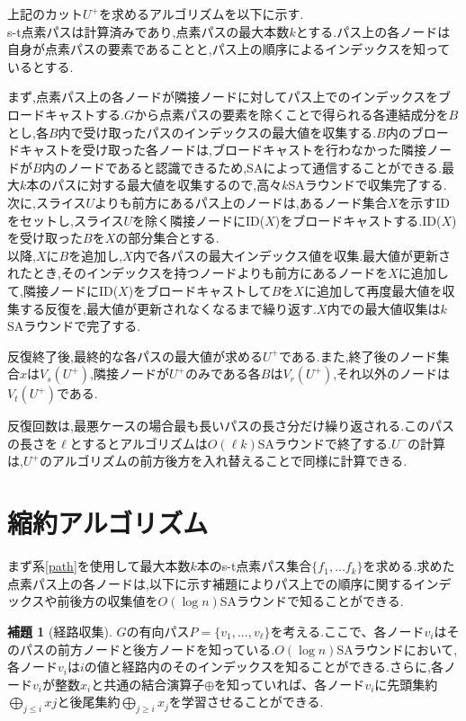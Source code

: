 \documentclass{thesis}
\theoremstyle{definition}
\newtheorem{lemma}{補題}
\begin{document}
上記のカット$U^+$を求めるアルゴリズムを以下に示す.\\
s-t点素パスは計算済みであり,点素パスの最大本数$k$とする.パス上の各ノードは自身が点素パスの要素であることと,パス上の順序によるインデックスを知っているとする.\par
まず,点素パス上の各ノードが隣接ノードに対してパス上でのインデックスをブロードキャストする.$G$から点素パスの要素を除くことで得られる各連結成分を$B$とし,各$B$内で受け取ったパスのインデックスの最大値を収集する.$B$内のブロードキャストを受け取った各ノードは,ブロードキャストを行わなかった隣接ノードが$B$内のノードであると認識できるため,SAによって通信することができる.最大$k$本のパスに対する最大値を収集するので,高々$k$SAラウンドで収集完了する.\\
次に,スライス$U$よりも前方にあるパス上のノードは,あるノード集合$X$を示すIDをセットし,スライス$U$を除く隣接ノードにID($X$)をブロードキャストする.ID($X$)を受け取った$B$を$X$の部分集合とする.\\
以降,$X$に$B$を追加し,$X$内で各パスの最大インデックス値を収集.最大値が更新されたとき,そのインデックスを持つノードよりも前方にあるノードを$X$に追加して,隣接ノードにID($X$)をブロードキャストして$B$を$X$に追加して再度最大値を収集する反復を,最大値が更新されなくなるまで繰り返す.$X$内での最大値収集は$k$SAラウンドで完了する.\par
反復終了後,最終的な各パスの最大値が求める$U^+$である.また,終了後のノード集合$x$は$V_s(U^+)$,隣接ノードが$U^+$のみである各$B$は$V_r(U^+)$,それ以外のノードは$V_t(U^+)$である.\par
反復回数は,最悪ケースの場合最も長いパスの長さ分だけ繰り返される.このパスの長さを$\ell$とするとアルゴリズムは$O(\ell k)$SAラウンドで終了する.$U^-$の計算は,$U^+$のアルゴリズムの前方後方を入れ替えることで同様に計算できる.

\section{縮約アルゴリズム}


まず系\ref{path}を使用して最大本数$k$本のs-t点素パス集合$\{f_1, \dots f_k\}$を求める.求めた点素パス上の各ノードは,以下に示す補題によりパス上での順序に関するインデックスや前後方の収集値を$O(\log n)$SAラウンドで知ることができる.

\begin{lemma}[経路収集\cite{li2018distributed}]
    $G$の有向パス$P = \{v_1,...,v_\ell\}$を考える.ここで、各ノード$v_i$はそのパスの前方ノードと後方ノードを知っている.$O(\log n)$SAラウンドにおいて,各ノード$v_i$は$i$の値と経路内のそのインデックスを知ることができる.さらに,各ノード$v_i$が整数$x_i$と共通の結合演算子$\oplus$を知っていれば、各ノード$v_i$に先頭集約$\bigoplus_{j\leq i}xj$と後尾集約$\bigoplus_{j\geq i}x_j$を学習させることができる.
  \end{lemma}
\end{document}

